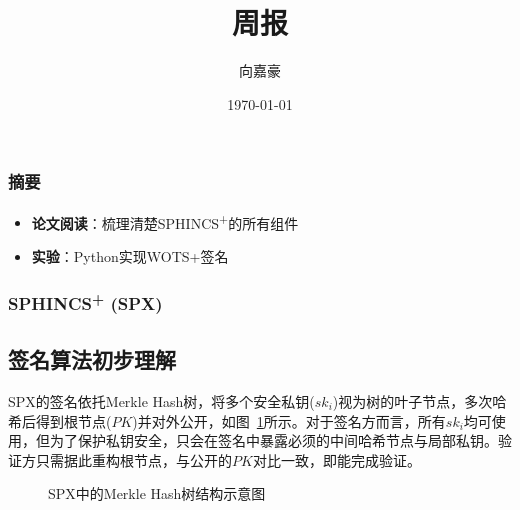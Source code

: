 \documentclass{beamer}
\title{\textbf{周报}}
\author{向嘉豪}
\institute{衡阳师范学院}
\date{\today}
\begin{document}
\begin{frame}
  \titlepage
\end{frame}

\begin{frame}
  \frametitle{摘要}
  \begin{itemize}
    \item \textbf{论文阅读}：梳理清楚SPHINCS\textsuperscript{+}的所有组件
    \item \textbf{实验}：Python实现WOTS+签名
  \end{itemize}
\end{frame}

\begin{frame}
  \frametitle{SPHINCS\textsuperscript{+} (SPX)}
  \subsection{签名算法初步理解}

  SPX的签名依托Merkle Hash树，将多个安全私钥($sk_i$)视为树的叶子节点，多次哈希后得到根节点($PK$)并对外公开，如图~\ref{fig:spx_sign}所示。对于签名方而言，所有$sk_i$均可使用，但为了保护私钥安全，只会在签名中暴露必须的中间哈希节点与局部私钥。验证方只需据此重构根节点，与公开的$PK$对比一致，即能完成验证。

  \begin{figure}[htbp]
    \centering
    \caption{SPX中的Merkle Hash树结构示意图}
    \label{fig:spx_sign}
  \end{figure}
\end{frame}
\end{document}
